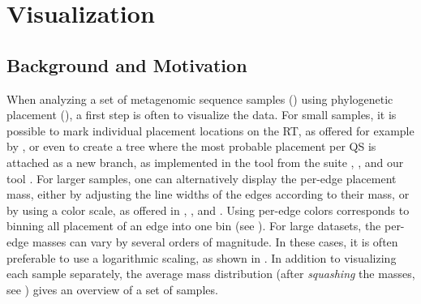 
\chapter{Visualization}
\label{ch:Visualization}



\section{Background and Motivation}
\label{ch:Visualization:sec:Motivation}

When analyzing a set of metagenomic sequence samples ()
using phylogenetic placement (),
a first step is often to visualize the data.
For small samples, it is possible to mark individual placement locations on the \acf{RT},
as offered for example by  \cite{Letunic2016},
or even to create a tree where the most probable placement per \acf{QS} is attached as a new branch,
as implemented in the  tool from the  suite \cite{Matsen2010},
 \cite{Berger2011,Stamatakis2014}, and our tool .
For larger samples, one can alternatively display the per-edge placement mass,
either by adjusting the line widths of the edges according to their mass, or by using a color scale,
as offered in  \cite{Yu2017}, , and .
Using per-edge colors corresponds to binning all placement of an edge into one bin
(see ).
For large datasets, the per-edge masses can vary by several orders of magnitude.
In these cases, it is often preferable to use a logarithmic scaling, as shown in .
In addition to visualizing each sample separately, the average mass distribution
(after \emph{squashing} the masses,
see )
gives an overview of a set of samples.


